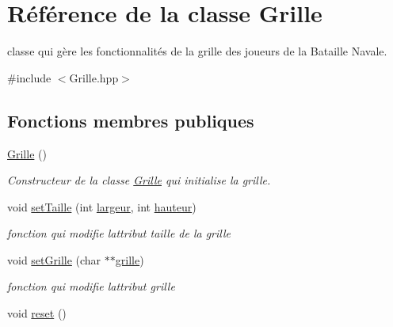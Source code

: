 \hypertarget{class_grille}{}\section{Référence de la classe Grille}
\label{class_grille}


classe qui gère les fonctionnalités de la grille des joueurs de la Bataille Navale.  




{\ttfamily \#include $<$Grille.\+hpp$>$}

\subsection*{Fonctions membres publiques}
\begin{DoxyCompactItemize}
\item 
\hyperlink{class_grille_a8a15d40f4706c34fb2f75d9289f9f615}{Grille} ()\hypertarget{class_grille_a8a15d40f4706c34fb2f75d9289f9f615}{}\label{class_grille_a8a15d40f4706c34fb2f75d9289f9f615}

\begin{DoxyCompactList}\small\item\em Constructeur de la classe \hyperlink{class_grille}{Grille} qui initialise la grille. \end{DoxyCompactList}\item 
void \hyperlink{class_grille_a595fb00ac47754dccfa9e1ee4cb8b520}{set\+Taille} (int \hyperlink{class_grille_a12252fd7e371af35a0afa6bb12aa4046}{largeur}, int \hyperlink{class_grille_a150412fc1212ec2624c2a62040d5ff88}{hauteur})
\begin{DoxyCompactList}\small\item\em fonction qui modifie l\textquotesingle{}attribut taille de la grille \end{DoxyCompactList}\item 
void \hyperlink{class_grille_ae76eba349ff664fcbfb04107d7a0413d}{set\+Grille} (char $\ast$$\ast$\hyperlink{class_grille_abd4bc59ff38259962e5d8d3c18d1ae6b}{grille})
\begin{DoxyCompactList}\small\item\em fonction qui modifie l\textquotesingle{}attribut grille \end{DoxyCompactList}\item 
void \hyperlink{class_grille_a17d8b9233b4d7fe24fe5e0c4809674e7}{reset} ()\hypertarget{class_grille_a17d8b9233b4d7fe24fe5e0c4809674e7}{}\label{class_grille_a17d8b9233b4d7fe24fe5e0c4809674e7}


\end{DoxyCompactItemize}
